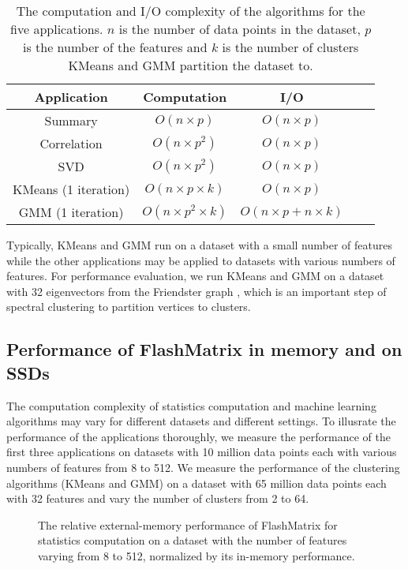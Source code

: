 \begin{table}
\begin{center}
\footnotesize
\begin{tabular}{|c|c|c|c|c|}
\hline
Application & Computation & I/O \\
\hline
Summary & $O(n \times p)$ & $O(n \times p)$ \\
\hline
Correlation & $O(n \times p^2)$ & $O(n \times p)$ \\
\hline
SVD & $O(n \times p^2)$ & $O(n \times p)$ \\
\hline
KMeans (1 iteration) & $O(n \times p \times k)$ & $O(n \times p)$ \\
\hline
GMM (1 iteration) & $O(n \times p^2 \times k)$ & $O(n \times p + n \times k)$ \\
\hline
\end{tabular}
\normalsize
\end{center}
\caption{The computation and I/O complexity of the algorithms for the five
	applications. $n$ is the number of data points in the dataset, $p$ is
	the number of the features and $k$ is the number of clusters KMeans and
GMM partition the dataset to.}
\label{graphs}
\end{table}

Typically, KMeans and GMM run on a dataset with a small number of features
while the other applications may be applied to datasets with various numbers
of features. For performance evaluation, we run KMeans and GMM on a dataset
with 32 eigenvectors from the Friendster graph \cite{friendster}, which is
an important step of spectral clustering \cite{} to partition vertices to
clusters.

\subsection{Performance of FlashMatrix in memory and on SSDs}

The computation complexity of statistics computation and machine learning
algorithms may vary for different datasets and different settings. To illusrate
the performance of the applications thoroughly, we measure the performance
of the first three applications on datasets with 10 million data points each
with various numbers of features from 8 to 512. We measure the performance of
the clustering algorithms (KMeans and GMM) on a dataset with 65 million data
points each with 32 features and vary the number of clusters from 2 to 64.

\begin{figure}
	\begin{center}
		\footnotesize
		
		\caption{The relative external-memory performance of FlashMatrix for
			statistics computation on a dataset with the number of features
		varying from 8 to 512, normalized by its in-memory performance.}
		\label{perf:stat}
	\end{center}
\end{figure}

